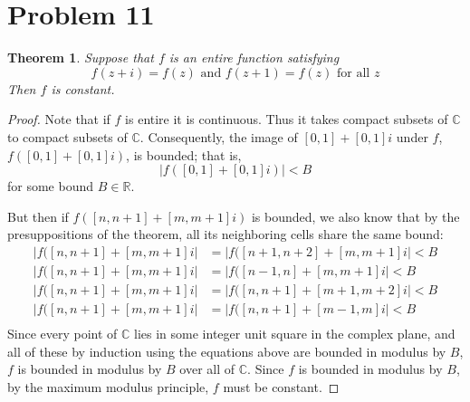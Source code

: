 \documentclass{article}
\newtheorem{theorem}[subsection]{Theorem}
\theoremstyle{definition}
\newcommand{\R}{\mathbb{R}}
\newcommand{\Co}{\mathbb{C}}
\newcommand{\abs}[1]{\left|#1\right|}
\begin{document}
\section{Problem 11}
\begin{theorem}
Suppose that $f$ is an entire function satisfying 
\[
f(z+i)=f(z) \text{ and } f(z+1)=f(z) \text{ for all } z
\]
Then $f$ is constant.
\end{theorem}
\begin{proof}
Note that if $f$ is entire it is continuous. Thus it takes compact subsets of $\Co$ to
compact subsets of $\Co$. Consequently, 
the image of $[0,1]+[0,1]i$ under $f$, $f([0,1] + [0,1]i)$, is bounded; that is,
\[
\abs{f([0,1]+[0,1]i)} < B
\]
for some bound $B \in \R$.

But then if $f([n,n+1] + [m,m+1]i)$ is bounded, we also know that by the presuppositions
of the theorem, all its neighboring cells share the same bound:
\begin{align*}
\abs{f([n,n+1]+[m,m+1]i}&=\abs{f([n+1,n+2]+[m,m+1]i} < B \\
\abs{f([n,n+1]+[m,m+1]i}&=\abs{f([n-1,n]+[m,m+1]i} < B \\
\abs{f([n,n+1]+[m,m+1]i}&=\abs{f([n,n+1]+[m+1,m+2]i} < B \\
\abs{f([n,n+1]+[m,m+1]i}&=\abs{f([n,n+1]+[m-1,m]i} < B \\
\end{align*}
Since every point of $\Co$ lies in some integer unit square in the complex
plane, and all of these by induction using the equations above are bounded
in modulus by $B$, $f$ is bounded in modulus by $B$ over all of $\Co$.
Since $f$ is bounded
in modulus by $B$, by the maximum modulus principle, $f$ must be constant.
\end{proof}
\end{document}
